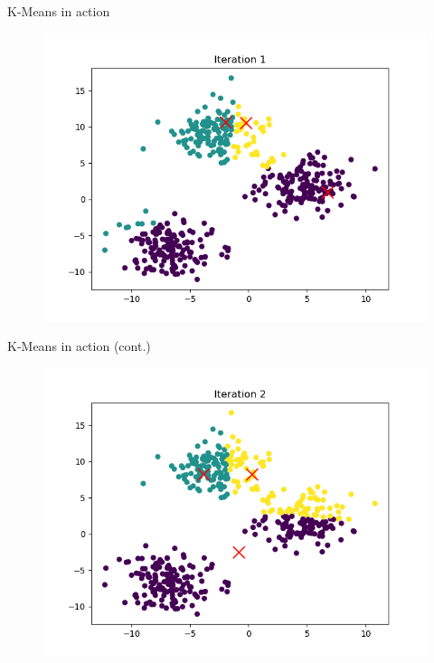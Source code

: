 \documentclass[serif, aspectratio=169]{beamer}
\begin{document}
\begin{frame}{K-Means in action}
    \begin{figure}
        \centering
        \includegraphics[width=\textwidth]{kmeans_in_action_figures/kmeans_iter_1.png}
    \end{figure}
\end{frame}
\begin{frame}{K-Means in action (cont.)}
    \begin{figure}
        \centering
        \includegraphics[width=\textwidth]{kmeans_in_action_figures/kmeans_iter_2.png}
    \end{figure}
\end{frame}
\end{document}
